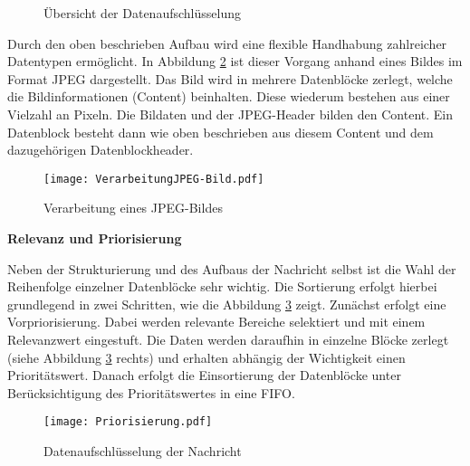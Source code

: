 \begin{figure}[H]
  \centering
  \hfill
  \caption{Übersicht der Datenaufschlüsselung}
  \label{fig:uebersichtdatenaufschluesselung}
\end{figure}

Durch den oben beschrieben Aufbau wird eine flexible Handhabung
zahlreicher Datentypen ermöglicht. In Abbildung \ref{fig:beispielJPG} ist
dieser Vorgang anhand eines Bildes im Format JPEG dargestellt. Das Bild wird in mehrere
Datenblöcke zerlegt, welche die Bildinformationen (Content) beinhalten.
Diese wiederum bestehen aus einer Vielzahl an Pixeln.
Die Bildaten und der JPEG-Header bilden den Content. Ein Datenblock besteht dann
wie oben beschrieben aus diesem Content und dem dazugehörigen Datenblockheader.

\begin{figure}[H]
	\centering
	\texttt{[image: VerarbeitungJPEG-Bild.pdf]}
	\caption{Verarbeitung eines JPEG-Bildes}
	\label{fig:beispielJPG}
\end{figure}

\textbf{Relevanz und Priorisierung}

Neben der Strukturierung und des Aufbaus der Nachricht selbst ist die
Wahl der Reihenfolge einzelner Datenblöcke sehr wichtig. Die Sortierung erfolgt
hierbei grundlegend in zwei Schritten, wie die Abbildung \ref{fig:priorisierungen}
zeigt.
Zunächst erfolgt eine Vorpriorisierung. Dabei werden relevante Bereiche
selektiert und mit einem Relevanzwert eingestuft. Die
Daten werden daraufhin in einzelne Blöcke zerlegt (siehe Abbildung
\ref{fig:priorisierungen} rechts) und erhalten abhängig der Wichtigkeit einen
Prioritätswert. Danach erfolgt die Einsortierung der Datenblöcke unter
Berücksichtigung des Prioritätswertes in eine \gls{FIFO}.

\begin{figure}[H]
	\centering
	\texttt{[image: Priorisierung.pdf]}
	\caption{Datenaufschlüsselung der Nachricht}
	\label{fig:priorisierungen}
\end{figure}

